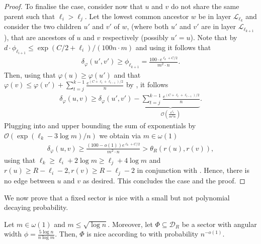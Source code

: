 \documentclass[letterpaper,11pt]{article}
\newcommand{\1}{\mathbb I}
\newcommand{\bigO}{\mathcal{O}}
\newcommand{\Layer}[1]{\mathcal{L}_{#1}}
\newcommand{\angulardist}[2]{\delta_\varphi(#1,#2)}
\begin{document}
\begin{proof}
To finalise the case, consider now that $u$ and $v$ do not share the same parent such that $\ell_i > \ell_j$.
Let the lowest common ancestor $w$ be in layer $\Layer{\ell_k}$ and consider the two children $u'$ and $v'$ of $w$, (where both $u'$ and $v'$ are in layer $\Layer{\ell_{k+1}}$), that are ancestors of $u$ and $v$ respectively (possibly $u' = u$). Note that by $d\cdot \phi_{\ell_{i+1}} \leq \exp(C/2 + \ell_i)/(100n\cdot m)$ and using  it follows that
%
\begin{align}\label{eq:case2-part1}
    \angulardist{u'}{v'} \geq \phi_{\ell_{k+1}} = \frac{100 \cdot e^{\ell_k + C/2 }}{m^2 \cdot n}.
\end{align}
%
Then, using that $\varphi(u)\geq \varphi(u')$ and that $\varphi(v) \leq \varphi(v') + \sum_{t = j}^{k-1} \frac{e^{(C+ \ell_t + \ell_{t -1})/2}}{n}$ by , it follows
%
\begin{align}\label{eq:case2-part2}
    \angulardist{u}{v} \geq \angulardist{u'}{v'} - \underbrace{\sum_{t = j}^{k-1} \frac{e^{(C+ \ell_t + \ell_{t -1})/2}}{n}}_{\bigO\left(\frac{e^{\ell_k}}{m^3 n}\right)}.
\end{align}
%
Plugging  into  and upper bounding the sum of exponentials by $\bigO(\exp{(\ell_k - 3\log m)} /n)$ we obtain via $m \in \omega(1)$
%
\begin{align*}
         \angulardist{u}{v} \geq \frac{(100 - o(1)) e^{\ell_k + C/2}}{m^2 \cdot n} >  \theta_R(r(u), r(v)),
\end{align*}
%
using that $\ell_k \geq \ell_i + 2\log m \geq \ell_j + 4\log m $ and $r(u) \geq R - \ell_i - 2, r(v) \geq R - \ell_j - 2$ in conjunction with . Hence, there is no edge between $u$ and $v$ as desired. This concludes the case and the proof.
\end{proof}
%
We now prove that a fixed sector is nice with a small but not polynomial decaying probability.
%
\begin{lemma}\label{lem:tree-prob}
    Let $m \in \omega(1)$ and $m \leq \sqrt{\log n}$. Moreover, let $\Phi \subseteq \mathcal{D}_R$ be a sector with angular width $\phi = \frac{5 \log n}{n\log m}$. Then, $\Phi$ is nice according to  with probability $n^{-o(1)}$.  
\end{lemma}
%
\end{document}
